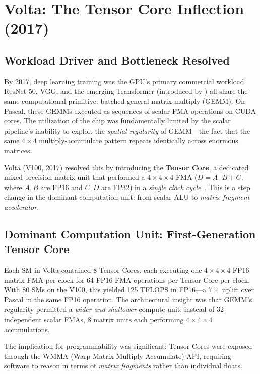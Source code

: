 \documentclass[10pt,twocolumn]{article}
\begin{document}
\section{Volta: The Tensor Core Inflection (2017)}
\label{sec:volta}

\subsection{Workload Driver and Bottleneck Resolved}

By 2017, deep learning training was the GPU's primary commercial workload. ResNet-50, VGG, and the emerging Transformer (introduced by \citealt{vaswani2017attention}) all share the same computational primitive: batched general matrix multiply (GEMM). On Pascal, these GEMMs executed as sequences of scalar FMA operations on CUDA cores. The utilization of the chip was fundamentally limited by the scalar pipeline's inability to exploit the \textit{spatial regularity} of GEMM—the fact that the same $4\times4$ multiply-accumulate pattern repeats identically across enormous matrices.

Volta (V100, 2017) resolved this by introducing the \textbf{Tensor Core}, a dedicated mixed-precision matrix unit that performed a $4\times4\times4$ FMA ($D = A \cdot B + C$, where $A, B$ are FP16 and $C, D$ are FP32) in a \textit{single clock cycle}~\citep{nvidia2017volta}. This is a step change in the dominant computation unit: from scalar ALU to \textit{matrix fragment accelerator}.

\subsection{Dominant Computation Unit: First-Generation Tensor Core}

Each SM in Volta contained 8 Tensor Cores, each executing one $4\times4\times4$ FP16 matrix FMA per clock for 64 FP16 FMA operations per Tensor Core per clock. With 80 SMs on the V100, this yielded 125 TFLOPS in FP16—a $7\times$ uplift over Pascal in the same FP16 operation. The architectural insight was that GEMM's regularity permitted a \textit{wider and shallower} compute unit: instead of 32 independent scalar FMAs, 8 matrix units each performing $4\times4\times4$ accumulations.

The implication for programmability was significant: Tensor Cores were exposed through the WMMA (Warp Matrix Multiply Accumulate) API, requiring software to reason in terms of \textit{matrix fragments} rather than individual floats.
\end{document}
